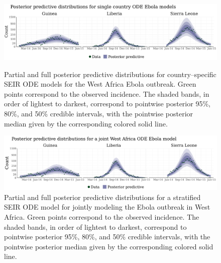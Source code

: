 \begin{figure}[htbp]
	\centering
	\includegraphics[width=\linewidth]{figures/ebola_single_postpreds_ode}
	\caption[Posterior predictive distributions for country--specific SEIR ODE models for the West Africa Ebola outbreak.]{Partial and full posterior predictive distributions for country--specific SEIR ODE models for the West Africa Ebola outbreak. Green points correspond to the observed incidence. The shaded bands, in order of lightest to darkest, correspond to pointwise posterior 95\%, 80\%, and 50\% credible intervals, with the pointwise posterior median given by the corresponding colored solid line.}
	\label{fig:ebola_single_postpreds_ode}
	
	\includegraphics[width=\linewidth]{figures/ebola_joint_postpreds_ode}
	\caption[Posterior predictive distributions for a stratified SEIR ODE model for the West Africa Ebola outbreak.]{Partial and full posterior predictive distributions for a stratified SEIR ODE model for jointly modeling the Ebola outbreak in West Africa. Green points correspond to the observed incidence. The shaded bands, in order of lightest to darkest, correspond to pointwise posterior 95\%, 80\%, and 50\% credible intervals, with the pointwise posterior median given by the corresponding colored solid line.}
	\label{fig:ebola_joint_postpreds_ode}
\end{figure}

